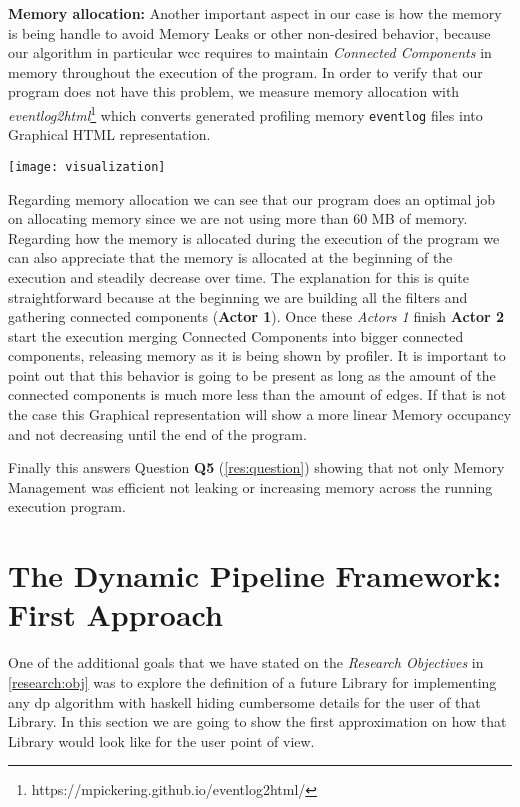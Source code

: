 \documentclass[preprint]{elsarticle}
\begin{document}
\textbf{Memory allocation:} Another important aspect in our case is how the memory is being handle to avoid Memory Leaks or other non-desired behavior, because our algorithm in particular \acrshort{wcc} requires
to maintain \textit{Connected Components} in memory throughout the execution of the program. 
In order to verify that our program does not have this problem, we measure memory allocation with \textit{eventlog2html}\footnote{https://mpickering.github.io/eventlog2html/} which converts generated profiling memory \texttt{eventlog}
files into Graphical HTML representation. 

\begin{minipage}[t]{\linewidth}
  \texttt{[image: visualization]}
  \captionsetup{type=figure}
  \label{fig:5}
\end{minipage}

Regarding memory allocation we can see that our program does an optimal job on allocating memory since we are not using more than $60$ MB of memory.
Regarding how the memory is allocated during the execution of the program we can also appreciate that the memory is allocated at the beginning of the execution and steadily decrease over time.
The explanation for this is quite straightforward because at the beginning we are building all the filters and gathering connected components (\textbf{Actor 1}). Once these \textit{Actors 1}
finish \textbf{Actor 2} start the execution merging Connected Components into bigger connected components, releasing memory as it is being shown by profiler.
It is important to point out that this behavior is going to be present as long as the amount of the connected components is much more less than the amount of edges. If that is not the case this Graphical
representation will show a more linear Memory occupancy and not decreasing until the end of the program. 

Finally this answers Question \textbf{Q5} (\autoref{res:question}) showing that not only Memory Management was efficient not leaking or increasing memory across the running execution program.

\section{The Dynamic Pipeline Framework: First Approach}\label{sec:approach}
One of the additional goals that we have stated on the \emph{Research Objectives} in \autoref{research:obj} was to explore the definition of a future Library for implementing any \acrshort{dp} algorithm with \acrshort{haskell} hiding cumbersome details for the user of that Library. In this section we are going to show the first approximation on how that Library would look like for the user point of view.
\end{document}
